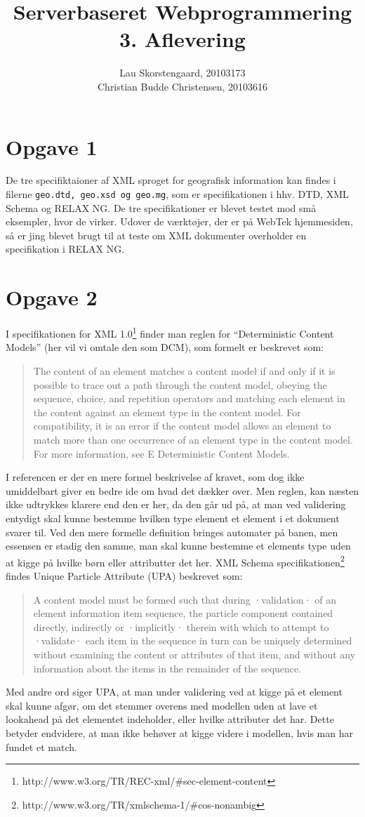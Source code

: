 \documentclass[a4paper,10pt]{article}
\author{Lau Skorstengaard, 20103173 \\Christian Budde Christensen, 20103616}
\title{Serverbaseret Webprogrammering\\3. Aflevering}
\begin{document}
\maketitle
\section*{Opgave 1}
De tre specifiktaioner af XML sproget for geografisk information kan findes i filerne \texttt{geo.dtd, geo.xsd og geo.mg}, som er specifikationen i hhv. DTD, XML Schema og RELAX NG. De tre specifikationer er blevet testet mod små eksempler, hvor de virker. Udover de værktøjer, der er på WebTek hjemmesiden, så er jing blevet brugt til at teste om XML dokumenter overholder en specifikation i RELAX NG.

\section*{Opgave 2}
I specifikationen for XML 1.0\footnote{http://www.w3.org/TR/REC-xml/\#sec-element-content} finder man reglen for ``Deterministic Content Models'' (her vil vi omtale den som DCM), som formelt er beskrevet som:
\begin{quotation}
The content of an element matches a content model if and only if it is possible to trace out a path through the content model, obeying the sequence, choice, and repetition operators and matching each element in the content against an element type in the content model. For compatibility, it is an error if the content model allows an element to match more than one occurrence of an element type in the content model. For more information, see E Deterministic Content Models.
\end{quotation}
I referencen er der en mere formel beskrivelse af kravet, som dog ikke umiddelbart giver en bedre ide om hvad det dækker over. Men reglen, kan næsten ikke udtrykkes klarere end den er her, da den går ud på, at man ved validering entydigt skal kunne bestemme hvilken type element et element i et dokument svarer til. Ved den mere formelle definition bringes automater på banen, men essensen er stadig den samme, man skal kunne bestemme et elements type uden at kigge på hvilke børn eller attributter det her.  XML Schema specifikationen\footnote{http://www.w3.org/TR/xmlschema-1/\#cos-nonambig} findes Unique Particle Attribute (UPA) beskrevet som:
\begin{quotation}
A content model must be formed such that during ·validation· of an element information item sequence, the particle component contained directly, indirectly or ·implicitly· therein with which to attempt to ·validate· each item in the sequence in turn can be uniquely determined without examining the content or attributes of that item, and without any information about the items in the remainder of the sequence.
\end{quotation}
Med andre ord siger UPA, at man under validering ved at kigge på et element skal kunne afgør, om det stemmer overens med modellen uden at lave et lookahead på det elementet indeholder, eller hvilke attributer det har. Dette betyder endvidere, at man ikke behøver at kigge videre i modellen, hvis man har fundet et match.
\end{document}
